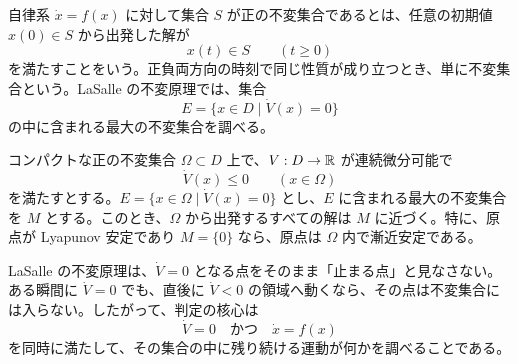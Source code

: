 \begin{definition}[不変集合]
自律系 $\dot{x}=f(x)$ に対して集合 $S$ が正の不変集合であるとは、任意の初期値 $x(0)\in S$ から出発した解が
\begin{equation}
  x(t)\in S\qquad(t\ge0)
\end{equation}
を満たすことをいう。正負両方向の時刻で同じ性質が成り立つとき、単に不変集合という。LaSalle の不変原理では、集合
\begin{equation}
  E=\{x\in D\mid \dot{V}(x)=0\}
\end{equation}
の中に含まれる最大の不変集合を調べる。
\end{definition}

\begin{theorem}
コンパクトな正の不変集合 $\Omega\subset D$ 上で、$V:D\to\mathbb{R}$ が連続微分可能で
\begin{equation}
  \dot{V}(x)\le0\qquad(x\in\Omega)
\end{equation}
を満たすとする。$E=\{x\in\Omega\mid\dot{V}(x)=0\}$ とし、$E$ に含まれる最大の不変集合を $M$ とする。このとき、$\Omega$ から出発するすべての解は $M$ に近づく。特に、原点が Lyapunov 安定であり $M=\{0\}$ なら、原点は $\Omega$ 内で漸近安定である。
\end{theorem}

LaSalle の不変原理は、$\dot{V}=0$ となる点をそのまま「止まる点」と見なさない。ある瞬間に $\dot{V}=0$ でも、直後に $\dot{V}<0$ の領域へ動くなら、その点は不変集合には入らない。したがって、判定の核心は
\begin{equation}
  \dot{V}=0\quad\text{かつ}\quad \dot{x}=f(x)
\end{equation}
を同時に満たして、その集合の中に残り続ける運動が何かを調べることである。

